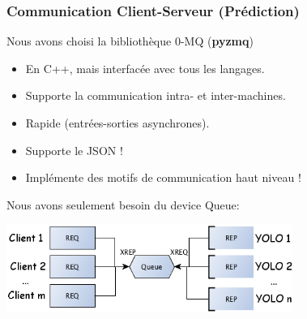 \documentclass[11pt]{beamer}
\begin{document}
\begin{frame}
\frametitle{Communication Client-Serveur (Prédiction)}
Nous avons choisi la bibliothèque 0-MQ (\textbf{pyzmq})
\begin{itemize}
\item En C++, mais interfacée avec tous les langages.
\item Supporte la communication intra- et inter-machines.
\item Rapide (entrées-sorties asynchrones).
\item Supporte le JSON !
\item Implémente des motifs de communication haut niveau !
\end{itemize}
Nous avons seulement besoin du device Queue:
 \begin{center}
     \includegraphics[width=0.7\textwidth]{images/Queue_YOLO.png}
     \end{center}
     \begin{flushright}
\end{flushright}
\end{frame}
\end{document}
